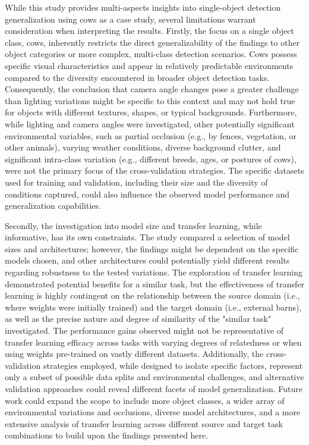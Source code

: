 While this study provides multi-aspects insights into single-object detection generalization using cows as a case study, several limitations warrant consideration when interpreting the results. Firstly, the focus on a single object class, cows, inherently restricts the direct generalizability of the findings to other object categories or more complex, multi-class detection scenarios. Cows possess specific visual characteristics and appear in relatively predictable environments compared to the diversity encountered in broader object detection tasks. Consequently, the conclusion that camera angle changes pose a greater challenge than lighting variations might be specific to this context and may not hold true for objects with different textures, shapes, or typical backgrounds. Furthermore, while lighting and camera angles were investigated, other potentially significant environmental variables, such as partial occlusion (e.g., by fences, vegetation, or other animals), varying weather conditions, diverse background clutter, and significant intra-class variation (e.g., different breeds, ages, or postures of cows), were not the primary focus of the cross-validation strategies. The specific datasets used for training and validation, including their size and the diversity of conditions captured, could also influence the observed model performance and generalization capabilities.

Secondly, the investigation into model size and transfer learning, while informative, has its own constraints. The study compared a selection of model sizes and architectures; however, the findings might be dependent on the specific models chosen, and other architectures could potentially yield different results regarding robustness to the tested variations. The exploration of transfer learning demonstrated potential benefits for a similar task, but the effectiveness of transfer learning is highly contingent on the relationship between the source domain (i.e., where weights were initially trained) and the target domain (i.e., external barns), as well as the precise nature and degree of similarity of the "similar task" investigated. The performance gains observed might not be representative of transfer learning efficacy across tasks with varying degrees of relatedness or when using weights pre-trained on vastly different datasets. Additionally, the cross-validation strategies employed, while designed to isolate specific factors, represent only a subset of possible data splits and environmental challenges, and alternative validation approaches could reveal different facets of model generalization. Future work could expand the scope to include more object classes, a wider array of environmental variations and occlusions, diverse model architectures, and a more extensive analysis of transfer learning across different source and target task combinations to build upon the findings presented here.